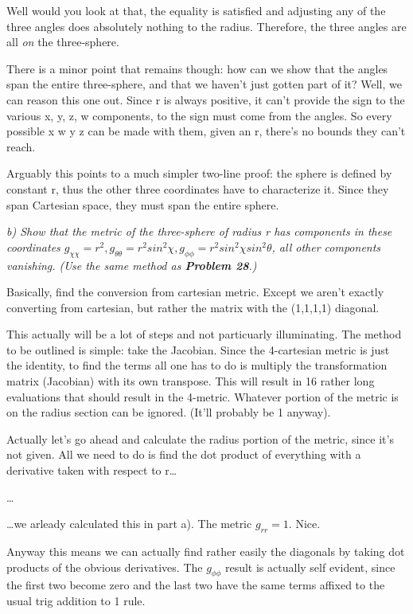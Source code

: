 \documentclass[landscape,letterpaper,10pt,english]{article}
\begin{document}
Well would you look at that, the equality is satisfied and adjusting any
of the three angles does absolutely nothing to the radius. Therefore,
the three angles are all \emph{on} the three-sphere.

There is a minor point that remains though: how can we show that the
angles span the entire three-sphere, and that we haven't just gotten
part of it? Well, we can reason this one out. Since r is always
positive, it can't provide the sign to the various x, y, z, w
components, to the sign must come from the angles. So every possible x w
y z can be made with them, given an r, there's no bounds they can't
reach.

Arguably this points to a much simpler two-line proof: the sphere is
defined by constant r, thus the other three coordinates have to
characterize it. Since they span Cartesian space, they must span the
entire sphere.

    \emph{b) Show that the metric of the three-sphere of radius r has
components in these coordinates
\(g_{\chi\chi} = r^2, g_{\theta\theta} = r^2sin^2\chi, g_{\phi\phi} = r^2sin^2\chi sin^2\theta\),
all other components vanishing. (Use the same method as \textbf{Problem
28}.)}

    Basically, find the conversion from cartesian metric. Except we aren't
exactly converting from cartesian, but rather the matrix with the
(1,1,1,1) diagonal.

This actually will be a lot of steps and not particuarly illuminating.
The method to be outlined is simple: take the Jacobian. Since the
4-cartesian metric is just the identity, to find the terms all one has
to do is multiply the transformation matrix (Jacobian) with its own
transpose. This will result in 16 rather long evaluations that should
result in the 4-metric. Whatever portion of the metric is on the radius
section can be ignored. (It'll probably be 1 anyway).

Actually let's go ahead and calculate the radius portion of the metric,
since it's not given. All we need to do is find the dot product of
everything with a derivative taken with respect to r\ldots{}

\ldots{}

\ldots we arleady calculated this in part a). The metric \(g_{rr}=1\).
Nice.

Anyway this means we can actually find rather easily the diagonals by
taking dot products of the obvious derivatives. The \(g_{\phi\phi}\)
result is actually self evident, since the first two become zero and the
last two have the same terms affixed to the usual trig addition to 1
rule.
\end{document}
